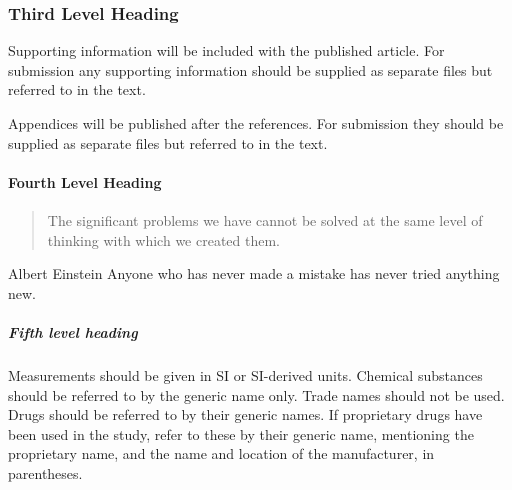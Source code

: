 \documentclass[num-refs]{wiley-article}
\begin{document}
\subsubsection{Third Level Heading}
Supporting information will be included with the published article. For submission any supporting information should be supplied as separate files but referred to in the text.

Appendices will be published after the references. For submission they should be supplied as separate files but referred to in the text.

\paragraph{Fourth Level Heading}
\begin{quote}
The significant problems we have cannot be solved at the same level of thinking with which we created them.
\end{quote}

\begin{epigraph}{Albert Einstein}
Anyone who has never made a mistake has never tried anything new.
\end{epigraph}

\subparagraph{Fifth level heading}
Measurements should be given in SI or SI-derived units.
Chemical substances should be referred to by the generic name only. Trade names should not be used. Drugs should be referred to by their generic names. If proprietary drugs have been used in the study, refer to these by their generic name, mentioning the proprietary name, and the name and location of the manufacturer, in parentheses.
\end{document}
